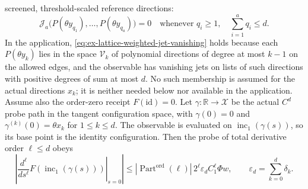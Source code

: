 \begin{proposition}
screened, threshold-scaled reference directions:
\begin{equation}
 \mathcal J_a\bigl(P(\theta y_{q_1}),\ldots,P(\theta y_{q_a})\bigr)=0
 \quad\text{whenever }q_i\ge1,\quad \sum_{i=1}^a q_i\le d.
 \label{eq:ex-lattice-weighted-jet-vanishing}
\end{equation}
In the application, \eqref{eq:ex-lattice-weighted-jet-vanishing} holds because each \(P(\theta y_k)\) lies in the
space \(\mathcal V_k\) of polynomial directions of degree at most \(k-1\)
on the allowed edges, and the observable has vanishing jets on lists of
such directions with positive degrees of sum at most \(d\). No such
membership is assumed for the actual directions \(x_k\); it is neither
needed below nor available in the application.
Assume also the order-zero receipt \(F(\mathrm{id})=0\).
Let \(\gamma:\mathbb R\to\mathcal X\) be the actual \(C^d\) probe path in
the tangent configuration space, with \(\gamma(0)=0\) and
\(\gamma^{(k)}(0)=\theta x_k\) for \(1\le k\le d\). The observable is
evaluated on
\(\operatorname{inc}_1(\gamma(s))\), so its base point is the identity
configuration. Then the probe of total derivative order \(\ell\le d\)
obeys
\begin{equation}
 \left|\left.\frac{d^\ell}{ds^\ell}
 F(\operatorname{inc}_1(\gamma(s)))\right|_{s=0}\right|
 \le |\operatorname{Part}^{\mathrm{ord}}(\ell)|\,2^\ell
       \varepsilon_d C_1^\ell\Phi w,\qquad
 \varepsilon_d=\sum_{k=0}^{d}\delta_k.
 \label{eq:ex-lattice-local-probe}
\end{equation}
\end{proposition}
